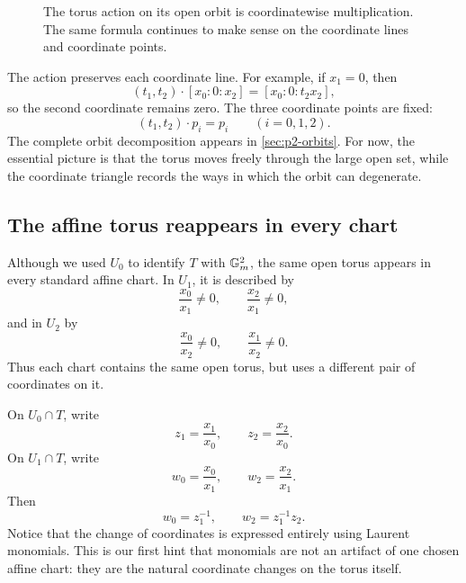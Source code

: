 \begin{figure}[ht]
\centering
{}
\caption{The torus action on its open orbit is coordinatewise
multiplication. The same formula continues to make sense on the
coordinate lines and coordinate points.}
\label{fig:p2-torus-action}
\end{figure}

The action preserves each coordinate line. For example, if \(x_1=0\),
then
\[
(t_1,t_2)\cdot[x_0:0:x_2]
=
[x_0:0:t_2x_2],
\]
so the second coordinate remains zero. The three coordinate points
are fixed:
\[
(t_1,t_2)\cdot p_i=p_i
\qquad
(i=0,1,2).
\]
The complete orbit decomposition appears in
\cref{sec:p2-orbits}. For now, the essential picture is that the torus
moves freely through the large open set, while the coordinate triangle
records the ways in which the orbit can degenerate.

\subsection{The affine torus reappears in every chart}

Although we used \(U_0\) to identify \(T\) with \(\mathbb{G}_{m}^2\), the same
open torus appears in every standard affine chart. In \(U_1\), it is
described by
\[
\frac{x_0}{x_1}\neq0,
\qquad
\frac{x_2}{x_1}\neq0,
\]
and in \(U_2\) by
\[
\frac{x_0}{x_2}\neq0,
\qquad
\frac{x_1}{x_2}\neq0.
\]
Thus each chart contains the same open torus, but uses a different
pair of coordinates on it.

On \(U_0\cap T\), write
\[
z_1=\frac{x_1}{x_0},
\qquad
z_2=\frac{x_2}{x_0}.
\]
On \(U_1\cap T\), write
\[
w_0=\frac{x_0}{x_1},
\qquad
w_2=\frac{x_2}{x_1}.
\]
Then
\[
w_0=z_1^{-1},
\qquad
w_2=z_1^{-1}z_2.
\]
Notice that the change of coordinates is expressed entirely using
Laurent monomials. This is our first hint that monomials are not an
artifact of one chosen affine chart: they are the natural coordinate
changes on the torus itself.

